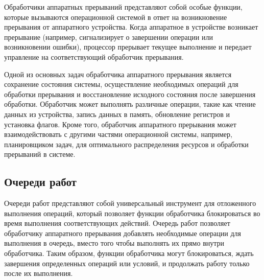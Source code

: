 Обработчики аппаратных прерываний представляют собой особые функции, которые вызываются операционной системой в ответ на возникновение прерывания от аппаратного устройства. 
Когда аппаратное в устройстве возникает прерывание (например, сигнализирует о завершении операции или возникновении ошибки), процессор прерывает текущее выполнение и передает управление на соответствующий обработчик прерывания.

Одной из основных задач обработчика аппаратного прерывания является сохранение состояния системы, осуществление необходимых операций для обработки прерывания и восстановление исходного состояния после завершения обработки. 
Обработчик может выполнять различные операции, такие как чтение данных из устройства, запись данных в память, обновление регистров и установка флагов.
Кроме того, обработчик аппаратного прерывания может взаимодействовать с другими частями операционной системы, например, планировщиком задач, для оптимального распределения ресурсов и обработки прерываний в системе.

\subsection{Очереди работ}

Очереди работ представляют собой универсальный инструмент для отложенного выполнения операций, который позволяет функции обработчика блокироваться во время выполнения соответствующих действий.
Очередь работ позволяет обработчику аппаратного прерывания добавлять необходимые операции для выполнения в очередь, вместо того чтобы выполнять их прямо внутри обработчика. Таким образом, функции обработчика могут блокироваться, ждать завершения определенных операций или условий, и продолжать работу только после их выполнения.

